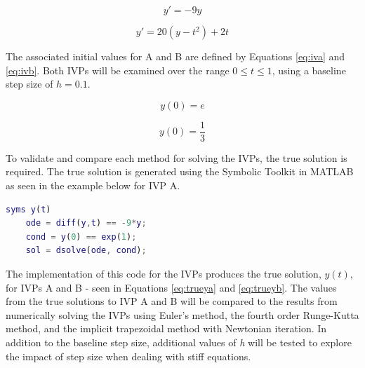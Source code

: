 \documentclass{article}
\begin{document}
\begin{center}
    \centering
    \begin{minipage}{0.5\textwidth}
        \centering
        \begin{equation}
		y' = -9y
		\label{eq:fa}
		\end{equation}
    \end{minipage}\hfill
    \begin{minipage}{0.5\textwidth}
        \centering
        \begin{equation}
        y' = 20 (y-t^2)+2t
		\label{eq:fb}
		\end{equation}
    \end{minipage}
\end{center}


The associated initial values for A and B are defined by Equations \ref{eq:iva} and \ref{eq:ivb}. Both IVPs will be examined over the range $ 0 \leq t \leq 1 $, using a baseline step size of $h=0.1$.

\begin{center}
    \centering
    \begin{minipage}{0.5\textwidth}
        \centering
        \begin{equation}
		y(0) = e
		\label{eq:iva}
		\end{equation}
    \end{minipage}\hfill
    \begin{minipage}{0.5\textwidth}
        \centering
        \begin{equation}
        y(0) = \frac{1}{3}
		\label{eq:ivb}
		\end{equation}
    \end{minipage}
\end{center}

To validate and compare each method for solving the IVPs, the true solution is required. The true solution is generated using the Symbolic Toolkit in MATLAB as seen in the example below for IVP A.

\bigskip
\begin{lstlisting}[language=Matlab]
	syms y(t)
	ode = diff(y,t) == -9*y;
	cond = y(0) == exp(1);
	sol = dsolve(ode, cond);
\end{lstlisting}
\bigskip

The implementation of this code for the IVPs produces the true solution, $y(t)$, for IVPs A and B - seen in Equations \ref{eq:trueya} and \ref{eq:trueyb}. The values from the true solutions to IVP A and B will be compared to the results from numerically solving the IVPs using Euler's method, the fourth order Runge-Kutta method, and the implicit trapezoidal method with Newtonian iteration. In addition to the baseline step size, additional values of \textit{h} will be tested to explore the impact of step size when dealing with stiff equations. 
\end{document}
